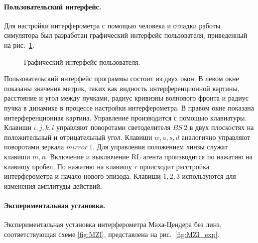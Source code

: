 \paragraph{Пользовательский интерфейс.}

Для настройки интерферометра с помощью человека и отладки работы симулятора был разработан графический интерфейс пользователя, приведенный на рис.~\ref{fig:gui}. 

\begin{figure}[ht]
\caption{Графический интерфейс пользователя.}
\label{fig:gui}
\end{figure}

Пользовательский интерфейс программы состоит из двух окон. В левом окне показаны значения метрик, таких как видность интерференционной картины, расстояние и угол между пучками, радиус кривизны волнового фронта и радиус пучка в динамике в процессе настройки интерферометра. В правом окне показана интерференционная картина. Управление производится с помощью клавиатуры. Клавиши $i,j,k,l$ управляют поворотами светоделителя $BS\ 2$ в двух плоскостях на положительный и отрицательный угол. Клавиши $w,a,s,d$ аналогично управляют поворотами зеркала $mirror\ 1$. Для управления положением линзы служат клавиши $m,n$. Включение и выключение RL агента производится по нажатию на клавишу пробел. По нажатию на клавишу $r$ происходит расстройка интерферометра и начало нового эпизода. Клавиши $1,2,3$ используются для изменения амплитуды действий.

\paragraph{Экспериментальная установка.} Экспериментальная установка интерферометра Маха-Цендера без линз, соответствующая схеме \ref{fig:MZI}, представлена на рис.~\ref{fig:MZI_exp}. 

